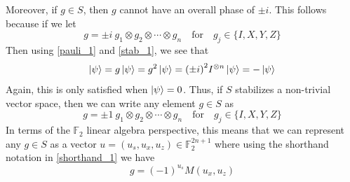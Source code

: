 \documentclass[11pt]{article}
\theoremstyle{definition}
\theoremstyle{plain}
\begin{document}
Moreover, if $g \in S$, then $g$ cannot have an overall phase of $\pm i$. This follows because if we let
\begin{equation}
  g = \pm i \ g_1 \otimes g_2 \otimes \cdots \otimes g_n
  \quad \text{for} \quad g_j \in \{I, X, Y, Z \} 
\end{equation}
Then using {\ref{pauli_1}} and {\ref{stab_1}}, we see that 
\begin{equation}
  \ket{\psi} = g \ket{\psi} = g^2 \ket{\psi} = {(\pm i)}^2 I^{\otimes n} \ket{\psi}
  = -\ket{\psi}
\end{equation}
Again, this is only satisfied when $\ket{\psi} = 0$. Thus, if $S$ stabilizes a non-trivial vector space, then we can write any element $g \in S$ as
\begin{equation}
  g = \pm 1 \ g_1 \otimes g_2 \otimes \cdots \otimes g_n
  \quad \text{for} \quad g_j \in \{I, X, Y, Z \} 
\end{equation}
In terms of the $\mathbb{F}_2$ linear algebra perspective, this means that we can represent any $g \in S$ as a vector $u = (u_s, u_x, u_z) \in \mathbb{F}_2^{2n+1}$ where using the shorthand notation in {\ref{shorthand_1}} we have
\begin{equation}\label{stab_shorthand}
  g = {(-1)}^{u_s} M(u_x, u_z) 
\end{equation}
\end{document}
